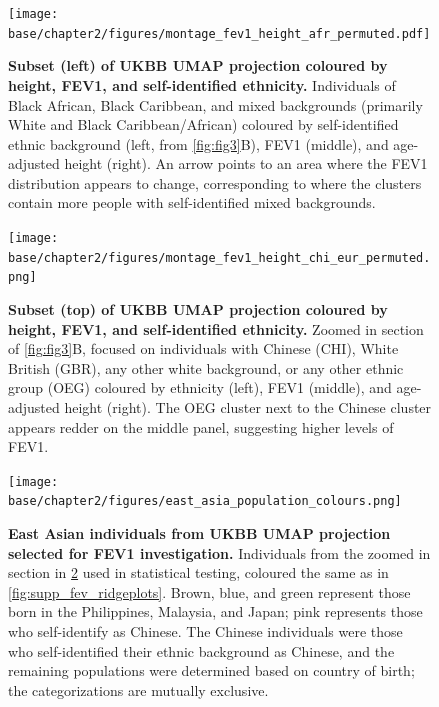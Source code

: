 \begin{figure}[ht]
    \centering
    \texttt{[image: base/chapter2/figures/montage\_fev1\_height\_afr\_permuted.pdf]}
    \caption[Subset (left) of UKBB UMAP projection coloured by height, FEV1, and self-identified ethnicity]{\textbf{Subset (left) of UKBB UMAP projection coloured by height, FEV1, and self-identified ethnicity.} Individuals of Black African, Black Caribbean, and mixed backgrounds (primarily White and Black Caribbean/African) coloured by self-identified ethnic background (left, from \ref{fig:fig3}B), FEV1 (middle), and age-adjusted height (right). An arrow points to an area where the FEV1 distribution appears to change, corresponding to where the clusters contain more people with self-identified mixed backgrounds.}
    \label{fig:supp_comparison_fev_afr}
\end{figure}

\newpage

\begin{figure}[ht]
    \centering
    \texttt{[image: base/chapter2/figures/montage\_fev1\_height\_chi\_eur\_permuted.png]}
    \caption[Subset (top) of UKBB UMAP projection coloured by height, FEV1, and self-identified ethnicity]{\textbf{Subset (top) of UKBB UMAP projection coloured by height, FEV1, and self-identified ethnicity.} Zoomed in section of \ref{fig:fig3}B, focused on individuals with Chinese (CHI), White British (GBR), any other white background, or any other ethnic group (OEG) coloured by ethnicity (left), FEV1 (middle), and age-adjusted height (right). The OEG cluster next to the Chinese cluster appears redder on the middle panel, suggesting higher levels of FEV1.}
    \label{fig:supp_comparison_fev_chi_eur}
\end{figure}

\newpage

\begin{figure}[ht]
    \centering
    \texttt{[image: base/chapter2/figures/east\_asia\_population\_colours.png]}
    \caption[East Asian individuals from UKBB UMAP projection selected for FEV1 investigation]{\textbf{East Asian individuals from UKBB UMAP projection selected for FEV1 investigation.} Individuals from the zoomed in section in \ref{fig:supp_comparison_fev_chi_eur} used in statistical testing, coloured the same as in \ref{fig:supp_fev_ridgeplots}. Brown, blue, and green represent those born in the Philippines, Malaysia, and Japan; pink represents those who self-identify as Chinese. The Chinese individuals were those who self-identified their ethnic background as Chinese, and the remaining populations were determined based on country of birth; the categorizations are mutually exclusive.}
    \label{fig:supp_fev_test_pops}
\end{figure}

